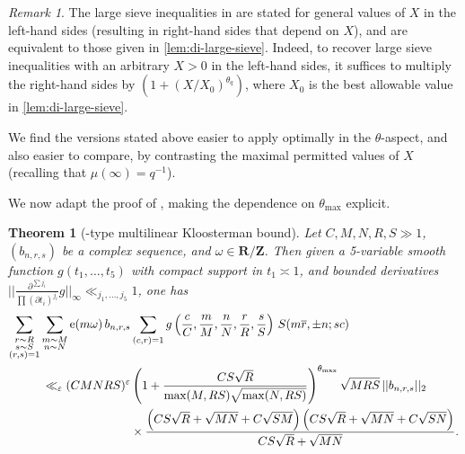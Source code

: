 \documentclass[reqno,11pt]{amsart}
\newtheorem{theorem}{Theorem}[section]
\theoremstyle{definition}
\theoremstyle{remark}
\newtheorem*{remark}{Remark}
\numberwithin{equation}{section}
\newcommand{\Z}{\mathbf{Z}}
\newcommand{\R}{\mathbf{R}}
\newcommand{\e}{\textnormal{e}}
\newcommand{\eps}{\varepsilon}
\renewcommand{\bar}{\overline}
\begin{document}
\begin{remark}
The large sieve inequalities in \cite{deshouillers1982kloosterman} are stated for general values of $X$ in the left-hand sides (resulting in right-hand sides that depend on $X$), and are equivalent to those given in \cref{lem:di-large-sieve}. Indeed, to recover large sieve inequalities with an arbitrary $X > 0$ in the left-hand sides, it suffices to multiply the right-hand sides by $(1 + (X/X_0)^{\theta_q})$, where $X_0$ is the best allowable value in \cref{lem:di-large-sieve}.

We find the versions stated above easier to apply optimally in the $\theta$-aspect, and also easier to compare, by contrasting the maximal permitted values of $X$ (recalling that $\mu(\infty) = q^{-1}$).
\end{remark}

We now adapt the proof of \cite[Theorem 11]{deshouillers1982kloosterman}, making the dependence on $\theta_{\max}$ explicit.

\begin{theorem}[\cite{deshouillers1982kloosterman}-type multilinear Kloosterman bound] \label{thm:di-kloosterman}
Let $C, M, N, R, S \gg 1$, $(b_{n,r,s})$ be a complex sequence, and $\omega \in \R/\Z$. Then given a 5-variable smooth function $g(t_1, \ldots, t_5)$ with compact support in $t_1 \asymp 1$, and bounded derivatives $||\frac{\partial^{\sum j_i}}{\prod (\partial t_i)^{j_i}} g||_\infty \ll_{j_1,\ldots,j_5} 1$, one has
\begin{equation} \label{eq:like-di-thm-11}
\begin{aligned}
    \sum_{\substack{r \sim R \\ s \sim S \\ (r, s) = 1}} 
    \sum_{\substack{m \sim M \\ n \sim N}} \e(m\omega)\, b_{n,r,s}
    &\sum_{(c, r) = 1} 
    g\left(\frac{c}{C}, \frac{m}{M}, \frac{n}{N}, \frac{r}{R}, \frac{s}{S}\right)\, S(m\bar{r}, \pm n; sc)
    \\
    \ll_\eps
    (CMNRS)^\eps 
    &\left(1 + \frac{CS\sqrt{R}}{\max(M, RS) \sqrt{\max(N, RS)}} \right)^{\theta_{\max}} 
    \sqrt{MRS}\, ||b_{n,r,s}||_2\,
    \\
    &\times
    \frac{\left(CS\sqrt{R} + \sqrt{MN} + C\sqrt{SM}\right)\left(CS\sqrt{R} + \sqrt{MN} + C\sqrt{SN}\right)}{CS\sqrt{R} + \sqrt{MN}}.
\end{aligned}
\end{equation}
\end{theorem}
\end{document}
